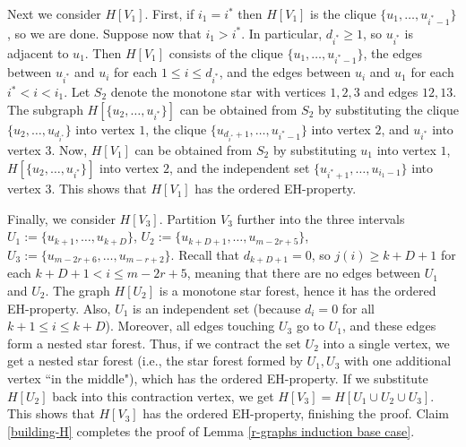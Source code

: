 \documentclass[11pt]{article}
\let\oldendproof\endproof
\renewenvironment{proof}[1][\proofname]{%
	\oldproof[\bf #1]%
}{\oldendproof}
\theoremstyle{plain}
\begin{document}
\begin{proof}[Proof of Lemma \ref{r-graphs induction base case}]
\begin{proof}
        Next we consider $H[V_1]$. 
        First, if $i_1 = i^*$ then $H[V_1]$ is the clique $\{u_1,\dots,u_{i^*-1}\}$, so we are done. Suppose now that $i_1 > i^*$. In particular, $d_{i^*} \geq 1$, so $u_{i^*}$ is adjacent to $u_1$. 
        Then $H[V_1]$ consists of the clique 
        $\{u_1,\dots,u_{i^*-1}\}$, the edges between $u_{i^*}$ and $u_i$ for each $1 \leq i \leq d_{i^*}$, and the edges between $u_i$ and $u_1$ for each $i^* < i < i_1$. 
        Let $S_2$ denote the monotone star with vertices $1,2,3$ and edges $12,13$.
        The subgraph $H[\{u_2,\dots,u_{i^*}\}]$ can be obtained from $S_2$  
        by substituting the clique $\{u_2,\dots,u_{d_{i^*}}\}$ into vertex $1$, the clique $\{u_{d_{i^*}+1},\dots,u_{i^*-1}\}$ into vertex $2$, and $u_{i^*}$ into vertex $3$. Now, $H[V_1]$ can be obtained from $S_2$ by substituting $u_1$ into vertex $1$, $H[\{u_2,\dots,u_{i^*}\}]$ into vertex $2$, and the independent set $\{u_{i^*+1},\dots,u_{i_1-1}\}$ into vertex $3$. This shows that $H[V_1]$ has the ordered EH-property.  

        Finally, we consider $H[V_3]$. Partition $V_3$ further into the three intervals $U_1 := \{u_{k+1},\dots,u_{k+D}\}$, 
        $U_2 := \{u_{k+D+1},\dots,u_{m-2r+5}\}$, 
        $U_3 := \{u_{m-2r+6},\dots,u_{m-r+2}\}$. Recall that $d_{k+D+1} = 0$, so $j(i) \geq k+D+1$ for each $k+D+1 < i \leq m-2r+5$, meaning that there are no edges between $U_1$ and $U_2$. 
        The graph $H[U_2]$ is a monotone star forest, hence it has the ordered EH-property.
        Also, $U_1$ is an independent set (because $d_i = 0$ for all $k+1 \leq i \leq k+D$). 
        Moreover, all edges touching $U_3$ go to $U_1$, and these edges form a nested star forest. Thus, if we contract the set $U_2$ into a single vertex, we get a nested star forest (i.e., the star forest formed by $U_1,U_3$ with one additional vertex ``in the middle"), which has the ordered EH-property. If we substitute $H[U_2]$ back into this contraction vertex, we get $H[V_3] = H[U_1 \cup U_2 \cup U_3]$. This shows that $H[V_3]$ has the ordered EH-property, finishing the \nolinebreak proof. 
\end{proof}
\noindent
Claim \ref{building-H} completes the proof of Lemma \ref{r-graphs induction base case}.
\end{proof}
\end{document}
